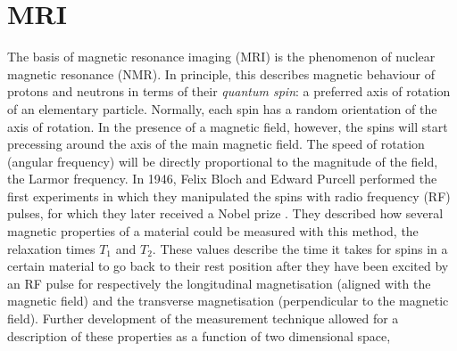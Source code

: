 \section*{MRI}
The basis of magnetic resonance imaging (MRI) is the phenomenon of nuclear magnetic resonance (NMR). In principle, this describes magnetic behaviour of protons and neutrons in terms of their \emph{quantum spin}: a preferred axis of rotation of an elementary particle. Normally, each spin has a random orientation of the axis of rotation. In the presence of a magnetic field, however, the spins will start precessing around the axis of the main magnetic field. The speed of rotation (angular frequency) will be directly proportional to the magnitude of the field, the Larmor frequency. In 1946, Felix Bloch and Edward Purcell %
performed the first experiments in which they manipulated the spins with radio frequency (RF) pulses, for which they later received a Nobel prize \cite{Bloch1946}. They described how several magnetic properties of a material could be measured with this method, the relaxation times $T_1$ and $T_2$. %
These values describe the time it takes for spins in a certain material to go back to their rest position after they have been excited by an RF pulse for respectively the longitudinal magnetisation (aligned with the magnetic field) and the transverse magnetisation (perpendicular to the magnetic field). %
Further development of the measurement technique allowed for a description of these properties as a function of two dimensional space,%

